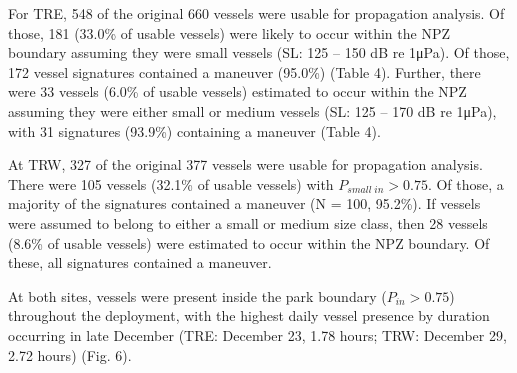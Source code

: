 \documentclass[
  letterpaper,
  oneside,
  open=any]{scrbook}
\begin{document}
For TRE, 548 of the original 660 vessels were usable for propagation
analysis. Of those, 181 (33.0\% of usable vessels) were likely to occur
within the NPZ boundary assuming they were small vessels (SL: 125 -- 150
dB re 1μPa). Of those, 172 vessel signatures contained a maneuver
(95.0\%) (Table 4). Further, there were 33 vessels (6.0\% of usable
vessels) estimated to occur within the NPZ assuming they were either
small or medium vessels (SL: 125 -- 170 dB re 1μPa), with 31 signatures
(93.9\%) containing a maneuver (Table 4).

At TRW, 327 of the original 377 vessels were usable for propagation
analysis. There were 105 vessels (32.1\% of usable vessels) with
\(P_{small\;in} > 0.75\). Of those, a majority of the signatures
contained a maneuver (N = 100, 95.2\%). If vessels were assumed to
belong to either a small or medium size class, then 28 vessels (8.6\% of
usable vessels) were estimated to occur within the NPZ boundary. Of
these, all signatures contained a maneuver.

At both sites, vessels were present inside the park boundary
(\(P_{in} > 0.75\)) throughout the deployment, with the highest daily
vessel presence by duration occurring in late December (TRE: December
23, 1.78 hours; TRW: December 29, 2.72 hours) (Fig. 6).
\end{document}

